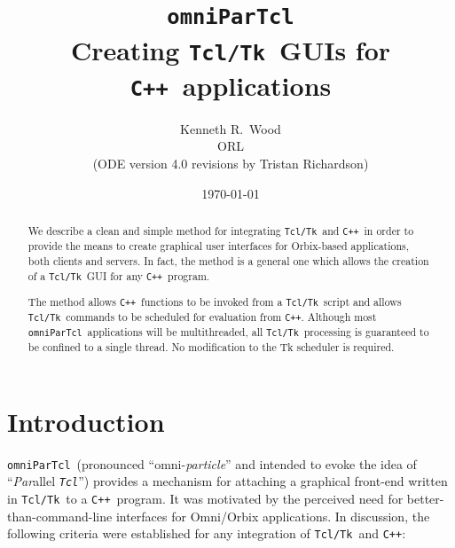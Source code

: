 \documentclass[11pt]{article}
\def\omniParTcl{{\tt omniParTcl}}
\def\tcltk{{\tt Tcl/Tk}}
\def\tcl{{\tt Tcl}}
\def\CXX{{\tt C++}}
\begin{document}
  
\title{{\bf \omniParTcl}\\
       {\normalsize Creating \tcltk\ GUIs for \CXX\ applications}}
\author{Kenneth R.\ Wood\\
        ORL\\
	{\small (ODE version 4.0 revisions by Tristan Richardson)}}
\date{\today} 
\maketitle

\begin{abstract}
\noindent
We describe a clean and simple method for integrating \tcltk\ and \CXX\ 
in order to provide the means to create graphical user interfaces for
Orbix-based applications, both clients and servers.  In fact, the method
is a general one which allows the creation of a \tcltk\ GUI for any \CXX\ 
program.

The method allows \CXX\ functions to be invoked from a \tcltk\ script and
allows \tcltk\ commands to be scheduled for evaluation from \CXX.  
Although most \omniParTcl\ applications will be multithreaded,
all \tcltk\ processing is guaranteed to be confined to a single thread.
No modification to the Tk scheduler is required.
\end{abstract}

\section{Introduction}

\omniParTcl\ (pronounced ``omni-{\em particle}'' and intended to
evoke the idea of ``{\em Par\/}allel {\em \tcl\/}'') provides a mechanism
for attaching a graphical front-end written in \tcltk\ to a \CXX\ 
program.  It was motivated by the perceived need for
better-than-command-line interfaces for Omni/Orbix applications.  In
discussion, the following criteria were established for any integration
of \tcltk\ and \CXX:
\end{document}
